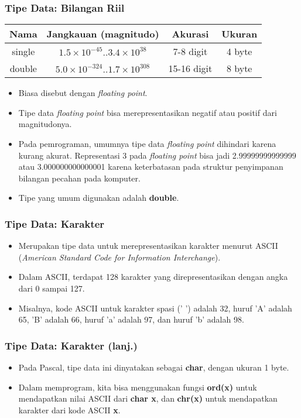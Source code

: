 \begin{frame}
\frametitle{Tipe Data: Bilangan Riil}
\begin{table}[ht]
  \begin{tabular}{|c|c|c|c|}
    \hline Nama  & Jangkauan (magnitudo) & Akurasi & Ukuran \\
    \hline single & $1.5\times10^{-45} .. 3.4\times10^{38}$ & 7-8 digit & 4 byte\\
    \hline double & $5.0\times10^{-324} .. 1.7\times10^{308}$ & 15-16 digit & 8 byte \\
    \hline
  \end{tabular}
\end{table}
\begin{itemize}
  \item Biasa disebut dengan \textit{floating point}.
  \item Tipe data \textit{floating point} bisa merepresentasikan negatif atau positif dari magnitudonya.
  \item Pada pemrograman, umumnya tipe data \textit{floating point} dihindari karena kurang akurat. Representasi 3 pada \textit{floating point} bisa jadi 2.99999999999999 atau 3.000000000000001 karena keterbatasan pada struktur penyimpanan bilangan pecahan pada komputer.
  \item Tipe yang umum digunakan adalah \alert{\textbf{double}}.
\end{itemize}
\end{frame}

\begin{frame}
\frametitle{Tipe Data: Karakter}
\begin{itemize}
  \item Merupakan tipe data untuk merepresentasikan karakter menurut ASCII (\textit{American Standard Code for Information Interchange}).
  \item Dalam ASCII, terdapat 128 karakter yang direpresentasikan dengan angka dari 0 sampai 127.
  \item Misalnya, kode ASCII untuk karakter spasi (' ') adalah 32, huruf 'A' adalah 65, 'B' adalah 66, huruf 'a' adalah 97, dan huruf 'b' adalah 98.
\end{itemize}
\end{frame}

\begin{frame}
\frametitle{Tipe Data: Karakter (lanj.)}
\begin{itemize}
  \item Pada Pascal, tipe data ini dinyatakan sebagai \alert{\textbf{char}}, dengan ukuran 1 byte.
  \item Dalam memprogram, kita bisa menggunakan fungsi \textbf{ord(x)} untuk mendapatkan nilai ASCII dari \textbf{char x}, dan \textbf{chr(x)} untuk mendapatkan karakter dari kode ASCII \textbf{x}.
\end{itemize}
\end{frame}

